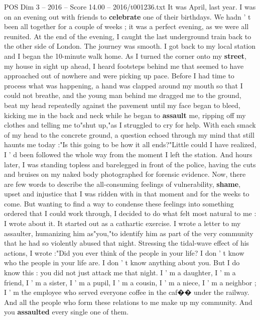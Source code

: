 \begin{textsample}{POS Dim 3 – 2016 – Score 14.00 – 2016/t001236.txt}  \label{ex:f3_pos_010}
It was April, last year.
I was on an evening out with friends to \textbf{celebrate} one of their birthdays.
We hadn ' t been all together for a couple of weeks ; it was a perfect evening, as we were all reunited.
At the end of the evening, I caught the last underground train back to the other side of London.
The journey was smooth.
I got back to my local station and I began the 10-minute walk home.
As I turned the corner onto my \textbf{street}, my house in sight up ahead, I heard footsteps behind me that seemed to have approached out of nowhere and were picking up pace.
Before I had time to process what was happening, a hand was clapped around my mouth so that I could not breathe, and the young man behind me dragged me to the ground, beat my head repeatedly against the pavement until my face began to bleed, kicking me in the back and neck while he began to \textbf{assault} me, ripping off my clothes and telling me to"shut up,"as I struggled to cry for help.
With each smack of my head to the concrete ground, a question echoed through my mind that still haunts me today :"Is this going to be how it all ends?"Little could I have realized, I ' d been followed the whole way from the moment I left the station.
And hours later, I was standing topless and barelegged in front of the police, having the cuts and bruises on my naked body photographed for forensic evidence.
Now, there are few words to describe the all-consuming feelings of vulnerability, \textbf{shame}, upset and injustice that I was ridden with in that moment and for the weeks to come.
But wanting to find a way to condense these feelings into something ordered that I could work through, I decided to do what felt most natural to me : I wrote about it.
It started out as a cathartic exercise.
I wrote a letter to my assaulter, humanizing him as"you,"to identify him as part of the very community that he had so violently abused that night.
Stressing the tidal-wave effect of his actions, I wrote :"Did you ever think of the people in your life?
I don ' t know who the people in your life are.
I don ' t know anything about you.
But I do know this : you did not just attack me that night.
I ' m a daughter, I ' m a friend, I ' m a sister, I ' m a pupil, I ' m a cousin, I ' m a niece, I ' m a neighbor ; I ' m the employee who served everyone coffee in the caf{\EmojiFont �}{\EmojiFont �} under the railway.
And all the people who form these relations to me make up my community.
And you \textbf{assaulted} every single one of them.

\end{textsample}
